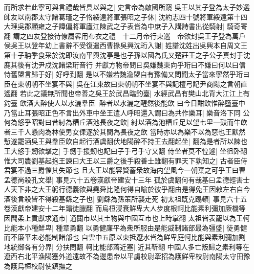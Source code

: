 而所求若此寧可與言禮哉皆具以與之|{
	史言帝為敵國所窺}
吳王以其子登為太子妙選師友以南郡太守諸葛瑾之子恪綏遠將軍張昭之子休|{
	沈約志四十號將軍綏遠第十四}
大理吳郡顧雍之子譚偏將軍廬江陳武之子表皆為中庶子入講詩書出從騎射|{
	騎奇寄翻}
謂之四友登接待僚屬畧用布衣之禮　十二月帝行東巡　帝欲封吳王子登為萬戶侯吳王以登年幼上書辭不受復遣西曹掾吳興沈珩入謝|{
	姓譜沈姓出吳興本自周文王第十子聃季食采於沈即汝南平輿沈亭是也子孫以國為氏又楚莊王之子公子真封于沈鹿其後有沈尹戍沈諸梁珩音行}
并獻方物帝問曰吳嫌魏東向乎珩曰不嫌曰何以曰信恃舊盟言歸于好|{
	好呼到翻}
是以不嫌若魏渝盟自有豫備又問聞太子當來寧然乎珩曰臣在東朝朝不坐宴不與|{
	吳在江東故曰東朝朝不坐宴不與記檀弓記尹商陽之言朝直遙翻}
若此之議無所聞也帝善之吳王於武昌臨釣臺|{
	水經武昌有樊山北背大江江上有釣臺}
飲酒大醉使人以水灑羣臣|{
	醉者以水灑之醒然後能飲}
曰今日酣飲惟醉墮臺中乃當止耳張昭正色不言出外車中坐王遣人呼昭還入謂曰為共作樂耳|{
	樂音洛下同}
公何為怒乎昭對曰昔紂為糟丘酒池長夜之飲|{
	紂以酒為池糟丘足以望七里一鼓而牛飲者三千人懸肉為林使男女倮逐於其間為長夜之飲}
當時亦以為樂不以為惡也王默然慙遂罷酒吳王與羣臣飲自起行酒虞翻伏地陽醉不持王去翻起坐|{
	翻為是者所以諫也}
王大怒手劒欲擊之|{
	手劒手援劒也記曰子手弓手守又翻}
侍坐者莫不惶遽|{
	坐徂卧翻}
惟大司農劉基起抱王諫曰大王以三爵之後手殺善士雖翻有罪天下孰知之|{
	古者臣侍君宴不過三爵懼其失節也}
且大王以能容賢蓄衆故海内望風今一朝棄之可乎王曰曹孟德尚殺孔文舉|{
	事見六十五卷漢獻帝建安十三年}
孤於虞翻何有哉基曰孟德輕害士人天下非之大王躬行德義欲與堯舜比隆何得自喻於彼乎翻由是得免王因敕左右自今酒後言殺皆不得殺基繇之子也|{
	劉繇為孫策所襲走死}
初太祖既克蹋頓|{
	事見六十五卷漢獻帝建安十二年蹋徒臘翻}
而烏桓浸衰鮮卑大人步度根軻比能素利彌加厥機等因閻柔上貢獻求通市|{
	通關市以其土物與中國互市也上時掌翻}
太祖皆表寵以為王軻比能本小種鮮卑|{
	種章勇翻}
以勇健廉平為衆所服由是能威制諸部最為彊盛|{
	徒勇健而不廉平未必能制諸部也}
自雲中五原以東抵遼水皆為鮮卑庭軻比能與素利彌加割地統御各有分界|{
	分扶問翻}
軻比能部落近塞|{
	近其靳翻}
中國人多亡叛歸之素利等在遼西右北平漁陽塞外道遠故不為邊患帝以平虜校尉牽招為護鮮卑校尉南陽太守田豫為護烏桓校尉使鎮撫之

